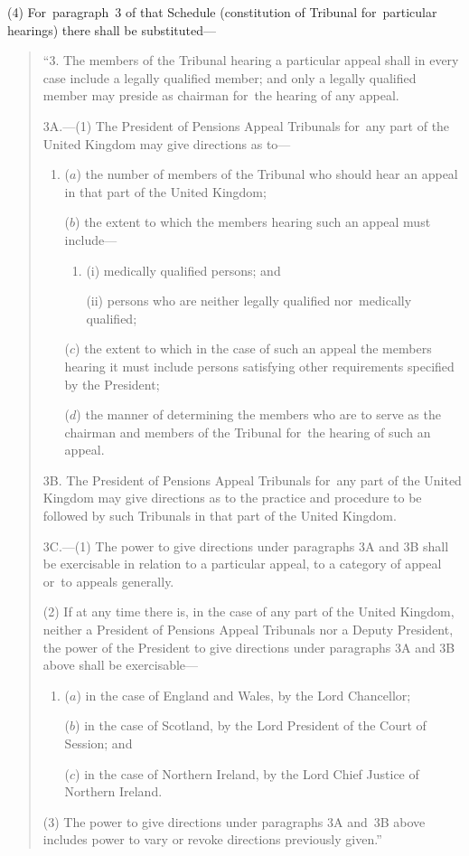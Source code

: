 \documentclass[12pt,a4paper]{article}
\begin{document}
(4) For~paragraph~3 of that Schedule (constitution of Tribunal for~particular hearings) there shall be substituted—
\begin{quotation}
“3. The members of the Tribunal hearing a particular appeal shall in every case include a legally qualified member; and only a legally qualified member may preside as chairman for~the hearing of any appeal.

\medskip

3A.---(1) The President of Pensions Appeal Tribunals for~any part of the United Kingdom may give directions as to—
\begin{enumerate}\item[]
($a$) the number of members of the Tribunal who should hear an appeal in that part of the United Kingdom;

($b$) the extent to which the members hearing such an appeal must include—
\begin{enumerate}\item[]
(i) medically qualified persons; and

(ii) persons who are neither legally qualified nor~medically qualified;
\end{enumerate}

($c$) the extent to which in the case of such an appeal the members hearing it must include persons satisfying other requirements specified by the President;

($d$) the manner of determining the members who are to serve as the chairman and members of the Tribunal for~the hearing of such an appeal.
\end{enumerate}

\medskip

3B. The President of Pensions Appeal Tribunals for~any part of the United Kingdom may give directions as to the practice and procedure to be followed by such Tribunals in that part of the United Kingdom.

\medskip

3C.---(1) The power to give directions under paragraphs 3A and 3B shall be exercisable in relation to a particular appeal, to a category of appeal or~to appeals generally.

(2) If at any time there is, in the case of any part of the United Kingdom, neither a President of Pensions Appeal Tribunals nor a Deputy President, the power of the President to give directions under paragraphs 3A and 3B above shall be exercisable—
\begin{enumerate}\item[]
($a$) in the case of England and Wales, by the Lord Chancellor;

($b$) in the case of Scotland, by the Lord President of the Court of Session; and

($c$) in the case of Northern Ireland, by the Lord Chief Justice of Northern Ireland.
\end{enumerate}

(3) The power to give directions under paragraphs 3A and~3B above includes power to vary or revoke directions previously given.”
\end{quotation}
\end{document}
